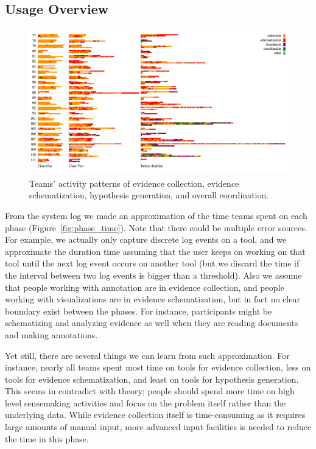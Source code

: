 \subsection{Usage Overview}

\begin{figure}
	\centering
	\includegraphics[height=2.5in]{img/phase_sequence}
	\caption{Teams' activity patterns of evidence collection, evidence schematization, hypothesis generation, and overall coordination.}
\end{figure}



From the system log we made an approximation of the time teams spent on each phase (Figure~\ref{fig:phase_time}). Note that there could be multiple error sources. For example, we actually only capture discrete log events on a tool, and we approximate the duration time assuming that the user keeps on working on that tool until the next log event occurs on another tool (but we discard the time if the interval between two log events is bigger than a threshold). Also we assume that people working with annotation are in evidence collection, and people working with visualizations are in evidence schematization, but in fact no clear boundary exist between the phases. For instance, participants might be schematizing and analyzing evidence as well when they are reading documents and making annotations. 

Yet still, there are several things we can learn from such approximation. For instance, nearly all teams spent most time on tools for evidence collection, less on tools for evidence schematization, and least on tools for hypothesis generation. This seems in contradict with theory; people should spend more time on high level sensemaking activities and focus on the problem itself rather than the underlying data. While evidence collection itself is time-consuming as it requires large amounts of manual input, more advanced input facilities is needed to reduce the time in this phase. 

